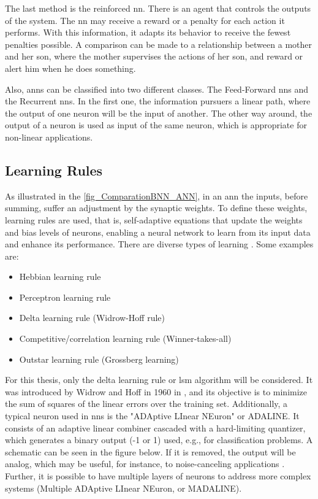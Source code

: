 The last method is the reinforced \gls{nn}. There is an agent that controls the outputs of the system. The \gls{nn} may receive a reward or a 
penalty for each action it performs. With this information, it adapts its behavior to receive the fewest penalties possible. A comparison can 
be made to a relationship between a mother and her son, where the mother supervises the actions of her son, and reward or alert him when he 
does something.

Also, \glspl{ann} can be classified into two different classes. The Feed-Forward \glspl{nn} and the Recurrent \glspl{nn}. In the first one, 
the information pursuers a linear path, where the output of one neuron will be the input of another. The other way around, the output of a 
neuron is used as input of the same neuron, which is appropriate for non-linear applications. 

\subsection{Learning Rules}

As illustrated in the \autoref{fig_ComparationBNN_ANN}, in an \gls{ann} the inputs, before summing, suffer an adjustment by the synaptic weights. 
To define these weights, learning rules are used, that is, self-adaptive equations that update the weights and bias levels of neurons, enabling 
a neural network to learn from its input data and enhance its performance. There are diverse types of learning \cite{haykin2009neural}. Some 
examples are:

\begin{itemize}
    \item Hebbian learning rule
    \item Perceptron learning rule
    \item Delta learning rule (Widrow-Hoff rule)
    \item Competitive/correlation learning rule (Winner-takes-all)
    \item Outstar learning rule (Grossberg learning)
\end{itemize}

For this thesis, only the delta learning rule or \gls{lsm} algorithm will be considered. It was introduced by Widrow and Hoff in 1960 in 
\cite{widrow1960adaptive}, and its objective is to minimize the sum of squares of the linear errors over the training set. Additionally, 
a typical neuron used in \glspl{nn} is the "ADAptive LInear NEuron" or ADALINE. It consists of an adaptive linear combiner cascaded with a 
hard-limiting quantizer, which generates a binary output (-1 or 1) used, e.g., for classification problems. A schematic can be seen in the 
figure below. If it is removed, the output will be analog, which may be useful, for instance, to noise-canceling applications 
\cite{widrow1985adaptive}. Further, it is possible to have multiple layers of neurons to address more complex systems (Multiple ADAptive 
LInear NEuron, or MADALINE).

